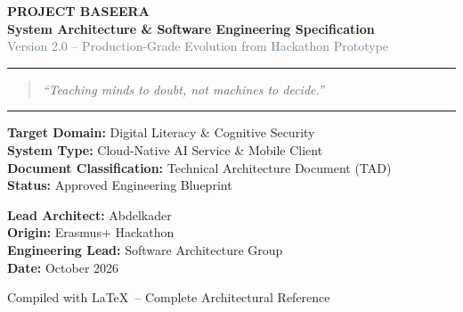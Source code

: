 \documentclass[11pt,a4paper]{report}
\begin{document}
\begin{titlepage}
    \centering
    \vspace*{1.5cm}
    
    {\Huge \bfseries \textcolor{primaryBlue}{PROJECT BASEERA}} \\
    \vspace{0.4cm}
    {\Large \bfseries \textcolor{accentGold}{System Architecture \& Software Engineering Specification}} \\
    \vspace{0.2cm}
    {\large \textcolor{slateGray}{Version 2.0 -- Production-Grade Evolution from Hackathon Prototype}}
    
    \vspace{1.5cm}
    \rule{\linewidth}{1.5pt}
    \vspace{0.6cm}
    
    \begin{quote}
        \centering
        \itshape
        ``Teaching minds to doubt, not machines to decide.''
    \end{quote}
    
    \vspace{0.6cm}
    \rule{\linewidth}{1.5pt}
    \vspace{2cm}
    
    \begin{minipage}{0.5\textwidth}
        \begin{flushleft} \large
            \textbf{Target Domain:} Digital Literacy \& Cognitive Security \\
            \textbf{System Type:} Cloud-Native AI Service \& Mobile Client \\
            \textbf{Document Classification:} Technical Architecture Document (TAD) \\
            \textbf{Status:} Approved Engineering Blueprint
        \end{flushleft}
    \end{minipage}
    \hfill
    \begin{minipage}{0.4\textwidth}
        \begin{flushright} \large
            \textbf{Lead Architect:} Abdelkader \\
            \textbf{Origin:} Erasmus+ Hackathon \\
            \textbf{Engineering Lead:} Software Architecture Group \\
            \textbf{Date:} October 2026
        \end{flushright}
    \end{minipage}
    
    \vfill
    {\small Compiled with \LaTeX\ -- Complete Architectural Reference}
\end{titlepage}
\end{document}
